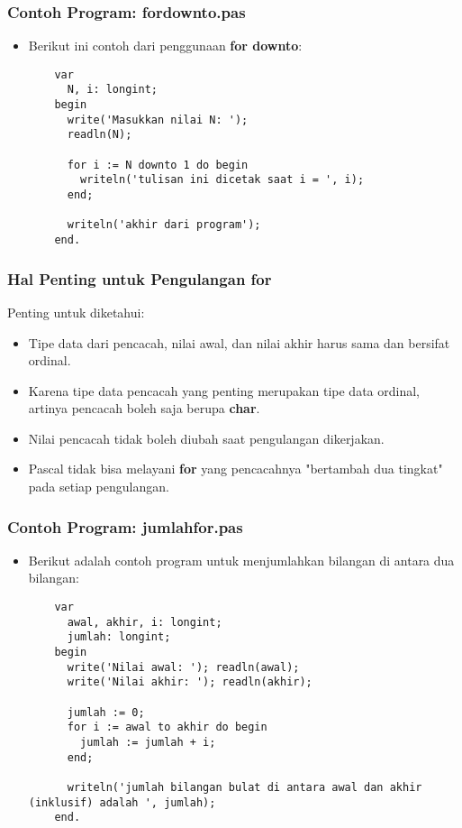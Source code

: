 \begin{frame}[fragile]
\frametitle{Contoh Program: fordownto.pas}
\begin{itemize}
  \item Berikut ini contoh dari penggunaan \textbf{for downto}:
  \begin{lstlisting}
    var
      N, i: longint;
    begin
      write('Masukkan nilai N: ');
      readln(N);

      for i := N downto 1 do begin
        writeln('tulisan ini dicetak saat i = ', i);
      end;

      writeln('akhir dari program');
    end.
  \end{lstlisting}
\end{itemize}
\end{frame}

\begin{frame}
\frametitle{Hal Penting untuk Pengulangan for}
Penting untuk diketahui:
\begin{itemize}
  \item Tipe data dari pencacah, nilai awal, dan nilai akhir harus sama dan bersifat \alert{ordinal}.
  \item Karena tipe data pencacah yang penting merupakan tipe data ordinal, artinya pencacah boleh saja berupa \textbf{char}.
  \item Nilai pencacah tidak boleh diubah saat pengulangan dikerjakan.
  \item Pascal tidak bisa melayani \textbf{for} yang pencacahnya "bertambah dua tingkat" pada setiap pengulangan.
\end{itemize}
\end{frame}

\begin{frame}[fragile]
\frametitle{Contoh Program: jumlahfor.pas}
\begin{itemize}
  \item Berikut adalah contoh program untuk menjumlahkan bilangan di antara dua bilangan:
  \begin{lstlisting}
    var
      awal, akhir, i: longint;
      jumlah: longint;
    begin
      write('Nilai awal: '); readln(awal);
      write('Nilai akhir: '); readln(akhir);

      jumlah := 0;
      for i := awal to akhir do begin
        jumlah := jumlah + i;
      end;

      writeln('jumlah bilangan bulat di antara awal dan akhir (inklusif) adalah ', jumlah);
    end.
  \end{lstlisting}
\end{itemize}
\end{frame}

